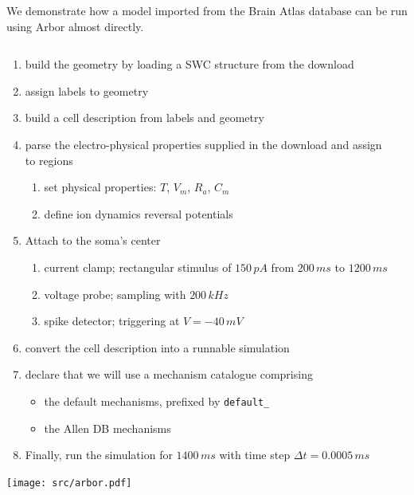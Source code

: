 \documentclass{beamer}
\begin{document}
\begin{frame}[t, fragile]
  We demonstrate how a model imported from the Brain Atlas database can be run using
  Arbor almost directly\cite{atlas}.\\[1.5ex]
  \begin{columns}[onlytextwidth]
    \begin{column}{.49\linewidth}
      \begin{enumerate}
        \item build the geometry by loading a SWC structure from the download
        \item assign labels to geometry
        \item build a cell description from labels and geometry
        \item parse the electro-physical properties supplied in the download and assign to regions
        \begin{enumerate}
          \item set physical properties: $T$, $V_{m}$, $R_{a}$, $C_{m}$
          \item define ion dynamics reversal potentials
        \end{enumerate}
        \item Attach to the soma's center
        \begin{enumerate}
          \item current clamp; rectangular stimulus of $150\,pA$ from $200\,ms$ to $1200\,ms$
          \item voltage probe; sampling with $200\,kHz$
          \item spike detector; triggering at $V=-40\,mV$
        \end{enumerate}
        \item convert the cell description into a runnable simulation
        \item declare that we will use a mechanism catalogue comprising
        \begin{itemize}
          \item the default mechanisms, prefixed by \texttt{default\_}
          \item the Allen DB mechanisms
        \end{itemize}
        \item Finally, run the simulation for $1400\,ms$ with time step $\Delta t = 0.0005\,ms$
      \end{enumerate}
      \texttt{[image: src/arbor.pdf]}
    \end{column}
    \begin{column}{.49\linewidth}
      \inputminted{python}{src/model.py}
    \end{column}
  \end{columns}
\end{frame}
\end{document}
